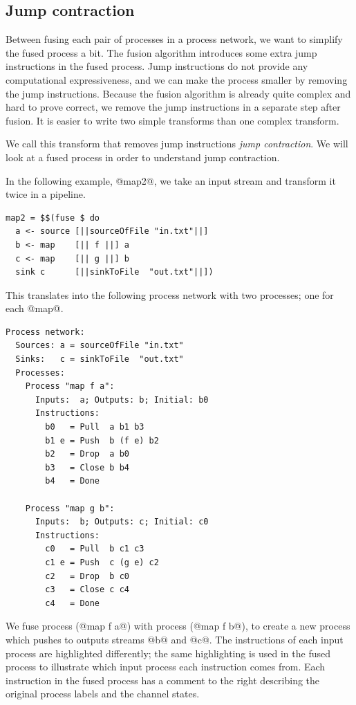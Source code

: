 \subsection{Jump contraction}
Between fusing each pair of processes in a process network, we want to simplify the fused process a bit.
The fusion algorithm introduces some extra jump instructions in the fused process.
Jump instructions do not provide any computational expressiveness, and we can make the process smaller by removing the jump instructions.
Because the fusion algorithm is already quite complex and hard to prove correct, we remove the jump instructions in a separate step after fusion.
It is easier to write two simple transforms than one complex transform.

We call this transform that removes jump instructions \emph{jump contraction}.
We will look at a fused process in order to understand jump contraction.

In the following example, @map2@, we take an input stream and transform it twice in a pipeline.

\begin{lstlisting}
map2 = $$(fuse $ do
  a <- source [||sourceOfFile "in.txt"||]
  b <- map    [|| f ||] a
  c <- map    [|| g ||] b
  sink c      [||sinkToFile  "out.txt"||])
\end{lstlisting}

This translates into the following process network with two processes; one for each @map@.

\begin{lstlisting}[linebackgroundcolor={
  \hilineFst{8}
  \hilineFst{9}
  \hilineFst{10}
  \hilineFst{11}
  \hilineFst{12}
  \hilineSnd{17}
  \hilineSnd{18}
  \hilineSnd{19}
  \hilineSnd{20}
  \hilineSnd{21}
  }]
Process network:
  Sources: a = sourceOfFile "in.txt"
  Sinks:   c = sinkToFile  "out.txt"
  Processes:
    Process "map f a":
      Inputs:  a; Outputs: b; Initial: b0
      Instructions:
        b0   = Pull  a b1 b3
        b1 e = Push  b (f e) b2
        b2   = Drop  a b0
        b3   = Close b b4        
        b4   = Done

    Process "map g b":
      Inputs:  b; Outputs: c; Initial: c0
      Instructions:
        c0   = Pull  b c1 c3      
        c1 e = Push  c (g e) c2     
        c2   = Drop  b c0
        c3   = Close c c4         
        c4   = Done
\end{lstlisting}

We fuse process (@map f a@) with process (@map f b@), to create a new process which pushes to outputs streams @b@ and @c@.
The instructions of each input process are highlighted differently; the same highlighting is used in the fused process to illustrate which input process each instruction comes from.
Each instruction in the fused process has a comment to the right describing the original process labels and the channel states.

